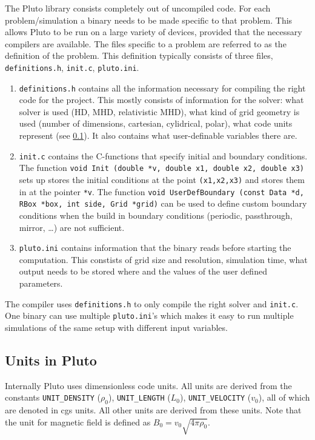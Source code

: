\documentclass[a4paper]{article}
\numberwithin{figure}{section}
\numberwithin{equation}{section}
\begin{document}
The Pluto library consists completely out of uncompiled code. For each problem/simulation a binary needs to be made specific to that problem. This allows Pluto to be run on a large variety of devices, provided that the necessary compilers are available.
The files specific to a problem are referred to as the definition of the problem. 
This definition typically consists of three files, \texttt{definitions.h}, \texttt{init.c}, \texttt{pluto.ini}.
\begin{enumerate}
	\item \texttt{definitions.h} contains all the information necessary for compiling the right code for the project. This mostly consists of information for the solver: what solver is used (HD, MHD, relativistic MHD), what kind of grid geometry is used (number of dimensions, cartesian, cylidrical, polar), what code units represent (see \cref{sec:units_in_pluto}). It also contains what user-definable variables there are.
	\item \texttt{init.c} contains the C-functions that specify initial and boundary conditions. The function \texttt{void Init (double *v, double x1, double x2, double x3)} sets up stores the initial conditions at the point \texttt{(x1,x2,x3)} and stores them in at the pointer \texttt{*v}.
		The function \texttt{void UserDefBoundary (const Data *d, RBox *box, int side, Grid *grid)} can be used to define custom boundary conditions when the build in boundary conditions (periodic, passthrough, mirror, \ldots) are not sufficient.
	\item \texttt{pluto.ini} contains information that the binary reads before starting the computation. This constists of grid size and resolution, simulation time, what output needs to be stored where and the values of the user defined parameters.
\end{enumerate}
The compiler uses \texttt{definitions.h} to only compile the right solver and \texttt{init.c}. One binary can use multiple \texttt{pluto.ini}'s which makes it easy to run multiple simulations of the same setup with different input variables. 

\subsection{Units in Pluto} \label{sec:units_in_pluto}

Internally Pluto uses dimensionless code units. All units are derived from the constants \texttt{UNIT\_DENSITY} ($\rho_0$), \texttt{UNIT\_LENGTH} ($L_0$), \texttt{UNIT\_VELOCITY} ($v_0$), all of which are denoted in cgs units. All other units are derived from these units.  
Note that the unit for magnetic field is defined as $B_0 = v_0\sqrt{4\pi \rho_0} $.
\end{document}
